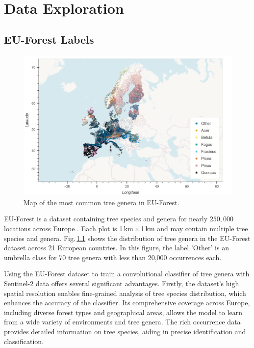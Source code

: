 \chapter{Data Exploration}
\label{chapter:data}
\section{EU-Forest Labels}

\begin{figure}[!thb]
    \centering
    \includegraphics[width=0.9\linewidth]{figures/figures_labels/genus_cutoff_map.png}
    \caption{Map of the most common tree genera in EU-Forest.}
    \label{fig:genus_cutoff_map}
\end{figure}

EU-Forest is a dataset containing tree species and genera for nearly
$250,000$ locations across Europe \cite{eu_forest_data}. Each plot is 1\,km\,×\,1\,km
and may contain multiple tree species and genera.
Fig.\,\ref{fig:genus_cutoff_map} shows the distribution of tree genera in the EU-Forest dataset
across 21 European countries. In this figure, the label 'Other' is an umbrella class for 70 
tree genera with less than 20,000 occurrences each.

Using the EU-Forest dataset to train a convolutional classifier of tree genera with 
Sentinel-2 data offers several significant advantages. 
Firstly, the dataset's high spatial resolution enables fine-grained 
analysis of tree species distribution, which enhances the accuracy of the classifier. 
Its comprehensive coverage across Europe, including diverse forest types and geographical areas, 
allows the model to learn from a wide variety of environments and tree genera.
The rich occurrence data provides detailed information on tree species, 
aiding in precise identification and classification.

